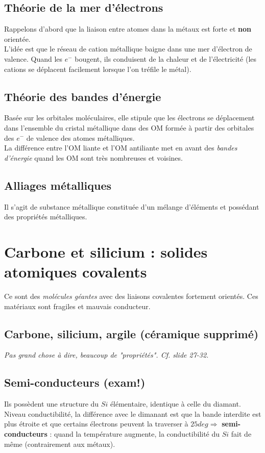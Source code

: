 \documentclass[british,french,11pt, a4paper, openany]{book}
\begin{document}
	\subsection*{Théorie de la mer d'électrons}
	Rappelons d'abord que la liaison entre atomes dans la métaux est forte et \textbf{non} orientée.\\
	
	L'idée est que le réseau de cation métallique baigne dans une mer d'électron de valence. Quand les $e^-$ bougent, ils conduisent de la chaleur et de l'électricité (les cations se déplacent facilement lorsque l'on tréfile le métal).
	
	\subsection*{Théorie des bandes d'énergie}
	Basée sur les orbitales moléculaires, elle stipule que les électrons se déplacement dans l'ensemble du cristal métallique dans des OM formée à partir des orbitales des $e^-$ de valence des atomes métalliques.\\
	La différence entre l'OM liante et l'OM antiliante met en avant des \textit{bandes d'énergie} quand les OM sont très nombreuses et voisines.
	
	\subsection*{Alliages métalliques}
	Il s'agit de substance métallique constituée d'un mélange d'éléments et possédant des propriétés métalliques.
	
	
	\section{Carbone et silicium : solides atomiques covalents}
	Ce sont des \textit{molécules géantes} avec des liaisons covalentes fortement orientés. Ces matériaux sont fragiles et mauvais conducteur.
	
	\subsection*{Carbone, silicium, argile (céramique supprimé)}
	\textit{Pas grand chose à dire, beaucoup de "propriétés". Cf. slide 27-32.}
	
	\subsection*{Semi-conducteurs (exam!)}
	Ils possèdent une structure du $Si$ élémentaire, identique à celle du diamant. Niveau conductibilité, la différence avec le dimanant est que la bande interdite est plus étroite et que certains électrons peuvent la traverser à $25deg \Rightarrow$ \textbf{semi-conducteurs} : quand la température augmente, la conductibilité du $Si$ fait de même (contrairement aux métaux).\\
	
\end{document}
